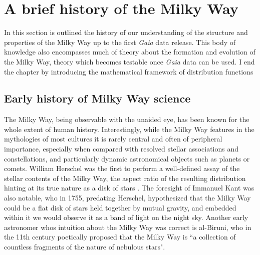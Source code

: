 
\section{A brief history of the Milky Way}

In this section is outlined the history of our understanding of the structure and properties of the Milky Way up to the first \textit{Gaia} data release. This body of knowledge also encompasses much of theory about the formation and evolution of the Milky Way, theory which becomes testable once \textit{Gaia} data can be used. I end the chapter by introducing the mathematical framework of distribution functions 

\subsection{Early history of Milky Way science}

The Milky Way, being observable with the unaided eye, has been known for the whole extent of human history. Interestingly, while the Milky Way features in the mythologies of most cultures it is rarely central and often of peripheral importance, especially when compared with resolved stellar associations and constellations, and particularly dynamic astronomical objects such as planets or comets. William Herschel was the first to perform a well-defined assay of the stellar contents of the Milky Way, the aspect ratio of the resulting distribution hinting at its true nature as a disk of stars \parencite{herschel1785}. The foresight of Immanuel Kant was also notable, who in 1755, predating Herschel, hypothesized that the Milky Way could be a flat disk of stars held together by mutual gravity, and embedded within it we would observe it as a band of light on the night sky. Another early astronomer whos intuition about the Milky Way was correct is al-Biruni, who in the 11th century poetically proposed that the Milky Way is ``a collection of countless fragments of the nature of nebulous stars".

